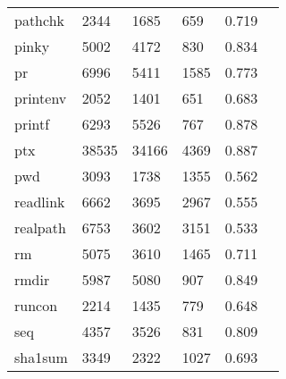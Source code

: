 \begin{longtable}{lp{2.4cm}p{2.4cm}p{2.4cm}p{2.4cm}p{2.4cm}}
pathchk   &                                    2344 &                        1685 &                          659 &                                   0.719 \\
pinky     &                                    5002 &                        4172 &                          830 &                                   0.834 \\
pr        &                                    6996 &                        5411 &                         1585 &                                   0.773 \\
printenv  &                                    2052 &                        1401 &                          651 &                                   0.683 \\
printf    &                                    6293 &                        5526 &                          767 &                                   0.878 \\
ptx       &                                   38535 &                       34166 &                         4369 &                                   0.887 \\
pwd       &                                    3093 &                        1738 &                         1355 &                                   0.562 \\
readlink  &                                    6662 &                        3695 &                         2967 &                                   0.555 \\
realpath  &                                    6753 &                        3602 &                         3151 &                                   0.533 \\
rm        &                                    5075 &                        3610 &                         1465 &                                   0.711 \\
rmdir     &                                    5987 &                        5080 &                          907 &                                   0.849 \\
runcon    &                                    2214 &                        1435 &                          779 &                                   0.648 \\
seq       &                                    4357 &                        3526 &                          831 &                                   0.809 \\
sha1sum   &                                    3349 &                        2322 &                         1027 &                                   0.693 \\

\end{longtable}
